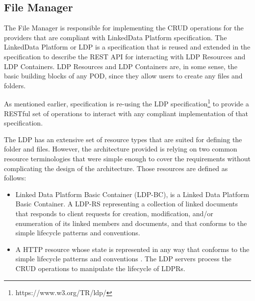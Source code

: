 \subsection{File Manager}
The File Manager is responsible for implementing the CRUD operations for the \solid{}  providers that are compliant with LinkedData Platform specification. The LinkedData Platform or LDP  is a specification that is reused and extended in the \solid{} specification to describe the REST API for interacting with LDP Resources and LDP Containers. LDP Resources and LDP Containers are, in some sense, the basic building blocks of any \solid{} POD, since they allow users to create any files and folders. 

As mentioned earlier,  \solid{} specification is re-using the LDP specification\footnote{https://www.w3.org/TR/ldp/}  to provide a RESTful set of operations to interact with any compliant implementation of that specification. 

The LDP has an extensive set of resource types that are suited for defining the folder and files. However, the architecture provided is relying on two common resource terminologies that were simple enough to cover the requirements without complicating the design of the architecture. Those resources are defined as follows:

\begin{itemize}
 	\item Linked Data Platform Basic Container (LDP-BC), is a Linked Data Platform Basic Container. A LDP-RS representing a collection of linked documents that responds to client requests for creation, modification, and/or enumeration of its linked members and documents, and that conforms to the simple lifecycle patterns and conventions.
	\item A HTTP resource whose state is represented in any way that conforms to the simple lifecycle patterns and conventions . The LDP servers process the CRUD operations to manipulate the lifecycle of LDPRs.
\end{itemize}


